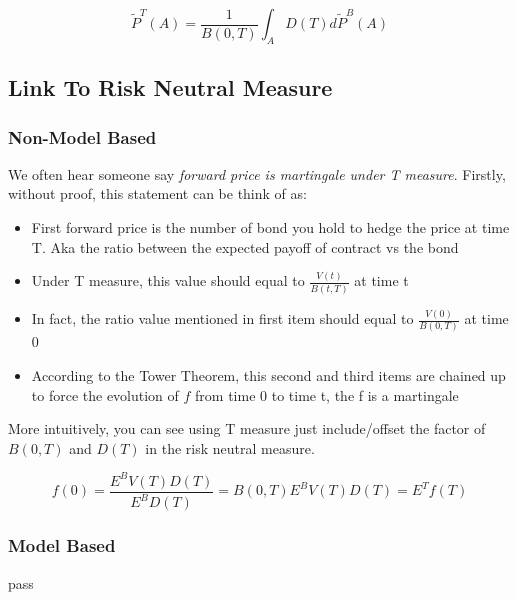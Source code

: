 \documentclass[11pt, oneside]{article}   	%
\begin{document}
\begin{equation}
  \widetilde{P}^{T}(A) = \frac{1}{B(0, T)} \int_A D(T) d\widetilde{P}^B(A)
\end{equation}


\subsection{Link To Risk Neutral Measure}
\subsubsection{Non-Model Based}

We often hear someone say {\color{red}\textit{forward price is martingale under T measure}}. Firstly, without proof, this statement can be think of as:
\begin{itemize}
\item First forward price is the number of bond you hold to hedge the price at time T. Aka the ratio between the expected payoff of contract vs the bond
\item Under T measure, this value should equal to $\frac{V(t)}{B(t, T)}$ at time t
\item In fact, the ratio value mentioned in first item should equal to $\frac{V(0)}{B(0, T)} $ at time 0
\item According to the {\color{red}Tower Theorem, this second and third items are chained up to force the evolution of $f$ from time 0 to time t, the f is a martingale}
\end{itemize}

More intuitively, you can see using T measure just include/offset the factor of $B(0, T)$ and $D(T)$ in the risk neutral measure.

\begin{equation}
  f(0) = \frac{E^{B} V(T) D(T)}{E^BD(T)} = B(0, T)E^{B} V(T) D(T) =  E^{T}f(T)
\end{equation}

\subsubsection{Model Based}
pass
\end{document}

